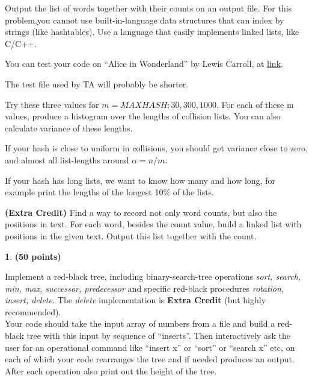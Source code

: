 \documentclass[11pt]{article}
\theoremstyle{definition}
\newtheorem{prob}{}
\newcommand{\solution}{\medskip\noindent{\color{DarkBlue}\textbf{Solution:}}}
\begin{document}
\noindent Output the list of words together with their counts on an output file.  For this problem,you  cannot  use  built-in-language  data structures  that  can  index  by  strings  (like  hashtables).  Use a language that easily implements linked lists, like C/C++.

\noindent You can test your code on “Alice in Wonderland” by Lewis Carroll, at \href{http://www.ccs.neu.edu/home/vip/teach/Algorithms/7_hash_RBtree_simpleDS/hw_hash_RBtree/alice_in_wonderland.txt}{link}.

\noindent The test file used by TA will probably be shorter.

\noindent Try these three values for $m = MAXHASH : 30, 300, 1000$. For each of these m values,
produce a histogram over the lengths of collision lists. You can also calculate variance
of these lengths.

\noindent If your hash is close to uniform in collisions, you should get variance close to zero, and
almost all list-lengths around $\alpha = n/m$.

\noindent If your hash has long lists, we want to know how many and how long, for example
print the lengths of the longest 10$\%$ of the lists.


\noindent \textbf{(Extra Credit)} Find a way to record not only word counts, but also the positions in text.  For each word, besides the count value, build a linked list with positions in the given text.  Output this list together with the count.

\solution


\begin{prob} \textbf{(50 points)}
\end{prob}

\noindent Implement  a  red-black  tree,  including  binary-search-tree  operations \textit{sort, search, min, max, successor, predecessor} and  specific  red-black  procedures \textit{rotation, insert, delete.}  The \textit{delete} implementation is \textbf{Extra Credit} (but highly recommended).
\\

\noindent Your code should take the input array of numbers from a file and build a red-black tree with this input by sequence of “inserts”.  Then interactively ask the user for an operational command like “insert x” or “sort” or “search x” etc, on each of which your code rearranges the tree and if needed produces an output.  After each operation also print out the height of the tree.
\\
\end{document}
